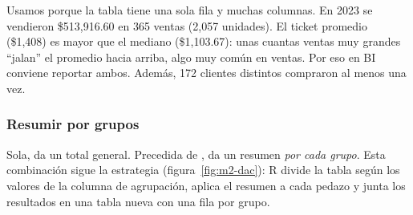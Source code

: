 Usamos  porque la tabla tiene una sola fila y muchas
columnas. En 2023 se vendieron \$513,916.60 en 365 ventas (2,057 unidades).
El ticket promedio (\$1,408) es mayor que el mediano (\$1,103.67): unas cuantas
ventas muy grandes ``jalan'' el promedio hacia arriba, algo muy común en
ventas. Por eso en BI conviene reportar ambos. Además, 172 clientes
distintos compraron al menos una vez.

\subsubsection{Resumir por grupos}

Sola,  da un total general. Precedida de
, da un resumen \emph{por cada grupo}. Esta combinación
sigue la estrategia 
(figura~\ref{fig:m2-dac}): R divide la tabla según los valores de la columna
de agrupación, aplica el resumen a cada pedazo y junta los resultados en una
tabla nueva con una fila por grupo.

